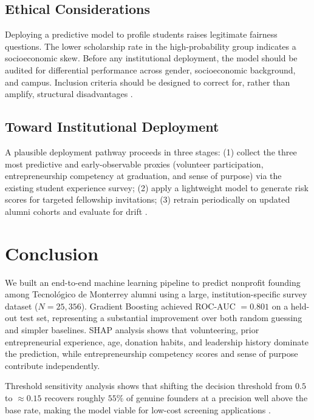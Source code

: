 \documentclass[10pt,twocolumn]{article}
\begin{document}
\subsection{Ethical Considerations}

Deploying a predictive model to profile students raises legitimate fairness
questions. The lower scholarship rate in the high-probability group indicates a
socioeconomic skew. Before any institutional deployment, the model should be
audited for differential performance across gender, socioeconomic background,
and campus. Inclusion criteria should be designed to correct for, rather than
amplify, structural disadvantages \cite{alnaemi2026}.

\subsection{Toward Institutional Deployment}

A plausible deployment pathway proceeds in three stages: (1) collect the three
most predictive and early-observable proxies (volunteer participation,
entrepreneurship competency at graduation, and sense of purpose) via the existing
student experience survey; (2) apply a lightweight model to generate risk scores
for targeted fellowship invitations; (3) retrain periodically on updated alumni
cohorts and evaluate for drift \cite{mahmoud2025, kamila2025}.

\section{Conclusion}
\label{sec:conclusion}

We built an end-to-end machine learning pipeline to predict nonprofit founding
among Tecnológico de Monterrey alumni using a large, institution-specific survey
dataset ($N = 25{,}356$). Gradient Boosting achieved ROC-AUC $= 0.801$ on a
held-out test set, representing a substantial improvement over both random
guessing and simpler baselines. SHAP analysis shows that volunteering, prior
entrepreneurial experience, age, donation habits, and leadership history
dominate the prediction, while entrepreneurship competency scores and sense of
purpose contribute independently.

Threshold sensitivity analysis shows that shifting the decision threshold from
$0.5$ to $\approx 0.15$ recovers roughly $55\%$ of genuine founders at a
precision well above the base rate, making the model viable for low-cost
screening applications \cite{senger2025}.
\end{document}
